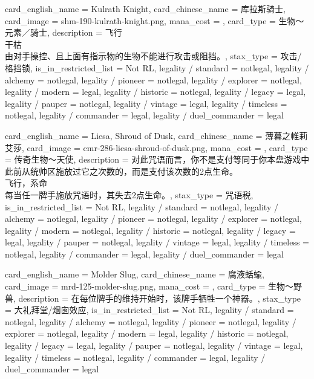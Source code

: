 \documentclass[lang = cn, color = black, 10pt]{AllThatStax}
\begin{document}
\card
{
	card_english_name = {Kulrath Knight},
	card_chinese_name = {库拉斯骑士},
	card_image = shm-190-kulrath-knight.png,
	mana_cost = ,
	card_type = 生物～元素／骑士,
	description = {飞行\\
干枯 \\
由对手操控、且上面有指示物的生物不能进行攻击或阻挡。},
	stax_type = 攻击/格挡锁,
	is_in_restricted_list = Not RL,
	legality / standard = notlegal,
	legality / alchemy = notlegal,
	legality / pioneer = notlegal,
	legality / explorer = notlegal,
	legality / modern = legal,
	legality / historic = notlegal,
	legality / legacy = legal,
	legality / pauper = notlegal,
	legality / vintage = legal,
	legality / timeless = notlegal,
	legality / commander = legal,
	legality / duel_commander = legal
}

\card
{
	card_english_name = {Liesa, Shroud of Dusk},
	card_chinese_name = {薄暮之帷莉艾莎},
	card_image = cmr-286-liesa-shroud-of-dusk.png,
	mana_cost = ,
	card_type = 传奇生物～天使,
	description = {对此咒语而言，你不是支付等同于你本盘游戏中此前从统帅区施放过它之次数的，而是支付该次数的2点生命。\\
飞行，系命\\
每当任一牌手施放咒语时，其失去2点生命。},
	stax_type = 咒语税,
	is_in_restricted_list = Not RL,
	legality / standard = notlegal,
	legality / alchemy = notlegal,
	legality / pioneer = notlegal,
	legality / explorer = notlegal,
	legality / modern = notlegal,
	legality / historic = notlegal,
	legality / legacy = legal,
	legality / pauper = notlegal,
	legality / vintage = legal,
	legality / timeless = notlegal,
	legality / commander = legal,
	legality / duel_commander = legal
}

\card
{
	card_english_name = {Molder Slug},
	card_chinese_name = {腐液蛞蝓},
	card_image = mrd-125-molder-slug.png,
	mana_cost = ,
	card_type = 生物～野兽,
	description = {在每位牌手的维持开始时，该牌手牺牲一个神器。},
	stax_type = 大礼拜堂/烟囱效应,
	is_in_restricted_list = Not RL,
	legality / standard = notlegal,
	legality / alchemy = notlegal,
	legality / pioneer = notlegal,
	legality / explorer = notlegal,
	legality / modern = legal,
	legality / historic = notlegal,
	legality / legacy = legal,
	legality / pauper = notlegal,
	legality / vintage = legal,
	legality / timeless = notlegal,
	legality / commander = legal,
	legality / duel_commander = legal
}
\end{document}
